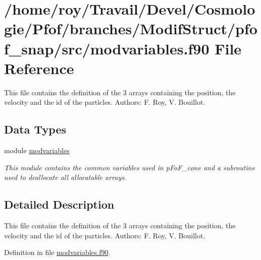 \hypertarget{pfof__snap_2src_2modvariables_8f90}{\section{/home/roy/\-Travail/\-Devel/\-Cosmologie/\-Pfof/branches/\-Modif\-Struct/pfof\-\_\-snap/src/modvariables.f90 File Reference}
\label{pfof__snap_2src_2modvariables_8f90}
}


This file contains the definition of the 3 arrays containing the position, the velocity and the id of the particles. Authors\-: F. Roy, V. Bouillot.  


\subsection*{Data Types}
\begin{DoxyCompactItemize}
\item 
module \hyperlink{classmodvariables}{modvariables}
\begin{DoxyCompactList}\small\item\em This module contains the common variables used in p\-Fo\-F\-\_\-cone and a subroutine used to deallocate all allocatable arrays. \end{DoxyCompactList}\end{DoxyCompactItemize}


\subsection{Detailed Description}
This file contains the definition of the 3 arrays containing the position, the velocity and the id of the particles. Authors\-: F. Roy, V. Bouillot. 

Definition in file \hyperlink{pfof__snap_2src_2modvariables_8f90_source}{modvariables.\-f90}.

